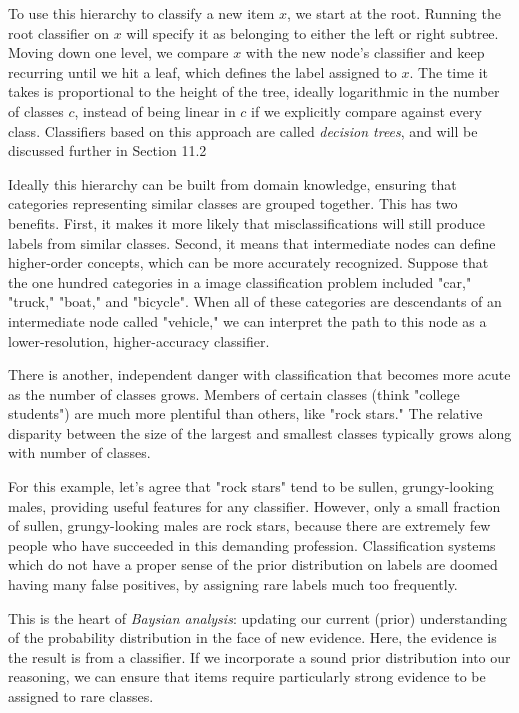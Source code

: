 \documentclass[10pt]{article}
\begin{document}
To use this hierarchy to classify a new item \(x\), we start at the root. Running the root classifier on \(x\) will specify it as belonging to either the left or right subtree. Moving down one level, we compare \(x\) with the new node's classifier and keep recurring until we hit a leaf, which defines the label assigned to \(x\). The time it takes is proportional to the height of the tree, ideally logarithmic in the number of classes \(c\), instead of being linear in \(c\) if we explicitly compare against every class. Classifiers based on this approach are called \emph{decision trees}, and will be discussed further in Section 11.2

Ideally this hierarchy can be built from domain knowledge, ensuring that categories representing similar classes are grouped together. This has two benefits. First, it makes it more likely that misclassifications will still produce labels from similar classes. Second, it means that intermediate nodes can define higher-order concepts, which can be more accurately recognized. Suppose that the one hundred categories in a image classification problem included "car," "truck," "boat," and "bicycle". When all of these categories are descendants of an intermediate node called "vehicle," we can interpret the path to this node as a lower-resolution, higher-accuracy classifier.

There is another, independent danger with classification that becomes more acute as the number of classes grows. Members of certain classes (think "college students") are much more plentiful than others, like "rock stars." The relative disparity between the size of the largest and smallest classes typically grows along with number of classes.

For this example, let's agree that "rock stars" tend to be sullen, grungy-looking males, providing useful features for any classifier. However, only a small fraction of sullen, grungy-looking males are rock stars, because there are extremely few people who have succeeded in this demanding profession. Classification systems which do not have a proper sense of the prior distribution on labels are doomed having many false positives, by assigning rare labels much too frequently.

This is the heart of \emph{Baysian analysis}: updating our current (prior) understanding of the probability distribution in the face of new evidence. Here, the evidence is the result is from a classifier. If we incorporate a sound prior distribution into our reasoning, we can ensure that items require particularly strong evidence to be assigned to rare classes.
\end{document}
